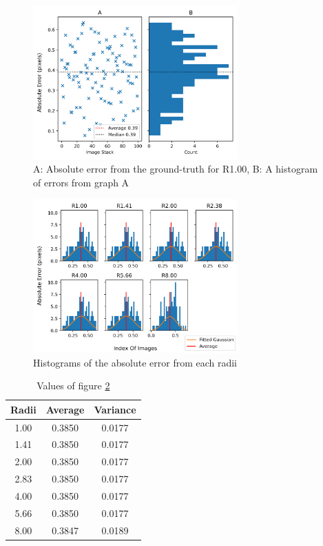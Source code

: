 \documentclass[aps,pra,a4paper,nofootinbib,onecolumn,tightenlines,longbibliography,12pt,amsfonts,amssymb,amsmath,floatfix]{revtex4-2} %
\begin{document}
  
  \begin{figure}[H]
    \begin{center}
      \includegraphics[width=0.7\textwidth]{project_pics/single_histo.png}
    \end{center}
    \caption{A: Absolute error from the ground-truth for R1.00, B: A histogram of errors from graph A}
    \label{fig:single_histo}
  \end{figure}
  

  \begin{figure}[H]
    \begin{center}
      \includegraphics[width=0.7\textwidth]{project_pics/distro.png}
    \end{center}
    \caption{Histograms of the absolute error from each radii}
    \label{fig:distro}
  \end{figure}


\begin{table}[H]
\begin{center}
\begin{tabular}{||c || c c||} 
 \hline
 Radii & Average & Variance \\ [0.5ex] 
 \hline\hline
 1.00 &  0.3850& 0.0177 \\ 
 \hline  
 1.41 &  0.3850& 0.0177  \\
 \hline 
 2.00 &  0.3850& 0.0177 \\
 \hline 
 2.83 &  0.3850& 0.0177 \\
 \hline 
 4.00 &  0.3850&  0.0177 \\ 
 \hline 
 5.66 &  0.3850& 0.0177 \\
 \hline
 8.00 &  0.3847& 0.0189\\ [1ex] 
 \hline
\end{tabular}
\end{center}
\caption{Values of figure \ref{fig:distro}}
\label{table1}
\end{table}
 
\end{document}
